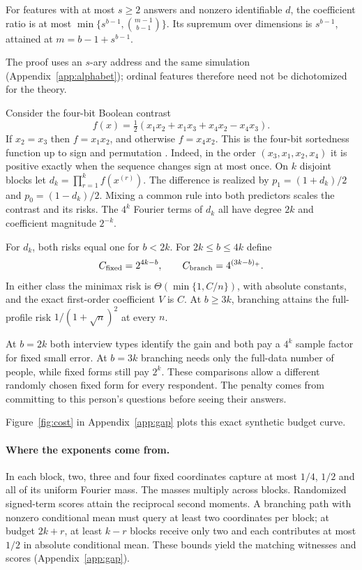 \begin{corollary}\label{cor:alphabet}
For features with at most $s\ge2$ answers and nonzero identifiable $d$, the coefficient ratio is at most $\min\{s^{b-1},\binom{m-1}{b-1}\}$. Its supremum over dimensions is $s^{b-1}$, attained at $m=b-1+s^{b-1}$.
\end{corollary}
The proof uses an $s$-ary address and the same simulation (Appendix~\ref{app:alphabet}); ordinal features therefore need not be dichotomized for the theory.


Consider the four-bit Boolean contrast
\begin{equation}
 f(x)=\tfrac12(x_1x_2+x_1x_3+x_4x_2-x_4x_3).
 \label{eq:block}
\end{equation}
If $x_2=x_3$ then $f=x_1x_2$, and otherwise $f=x_4x_2$. This is the four-bit sortedness function up to sign and permutation \citep[Chapter~1]{odonnell2014}. Indeed, in the order $(x_3,x_1,x_2,x_4)$ it is positive exactly when the sequence changes sign at most once. On $k$ disjoint blocks let $d_k=\prod_{r=1}^k f(x^{(r)})$. The difference is realized by $p_1=(1+d_k)/2$ and $p_0=(1-d_k)/2$. Mixing a common rule into both predictors scales the contrast and its risks. The $4^k$ Fourier terms of $d_k$ all have degree $2k$ and coefficient magnitude $2^{-k}$.

\begin{theorem}\label{thm:gap}
For $d_k$, both risks equal one for $b<2k$. For $2k\le b\le4k$ define
\[
 C_{\rm fixed}=2^{4k-b},\qquad
 C_{\rm branch}=4^{(3k-b)_+}.
\]
In either class the minimax risk is $\Theta(\min\{1,C/n\})$, with absolute constants, and the exact first-order coefficient $V$ is $C$. At $b\ge3k$, branching attains the full-profile risk $1/(1+\sqrt n)^2$ at every $n$.
\end{theorem}

At $b=2k$ both interview types identify the gain and both pay a $4^k$ sample factor for fixed small error. At $b=3k$ branching needs only the full-data number of people, while fixed forms still pay $2^k$. These comparisons allow a different randomly chosen fixed form for every respondent. The penalty comes from committing to this person's questions before seeing their answers.

Figure~\ref{fig:cost} in Appendix~\ref{app:gap} plots this exact synthetic budget curve.

\paragraph{Where the exponents come from.}
In each block, two, three and four fixed coordinates capture at most $1/4$, $1/2$ and all of its uniform Fourier mass. The masses multiply across blocks. Randomized signed-term scores attain the reciprocal second moments. A branching path with nonzero conditional mean must query at least two coordinates per block; at budget $2k+r$, at least $k-r$ blocks receive only two and each contributes at most $1/2$ in absolute conditional mean. These bounds yield the matching witnesses and scores (Appendix~\ref{app:gap}).

